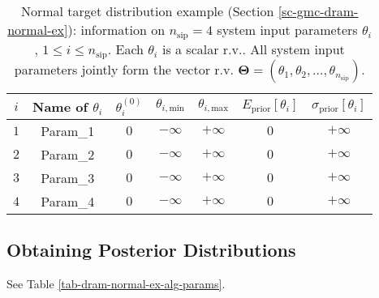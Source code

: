 \begin{table}[h!]
\begin{center}
\begin{tabular}{|c|c|c|c|c|c|c|}
\hline
 $i$      & Name of $\theta_i$ & $\theta_i^{(0)}$ & $\theta_{i,\text{min}}$ & $\theta_{i,\text{max}}$ & $E_{\text{prior}}[\theta_i]$ & $\sigma_{\text{prior}}[\theta_i]$ \\
\hline
\hline
 $1$      & Param\_1           & $0$              & $-\infty$               & $+\infty$               & $0$                          & $+\infty$                    \\
\hline
 $2$      & Param\_2           & $0$              & $-\infty$               & $+\infty$               & $0$                          & $+\infty$                    \\
\hline
 $3$      & Param\_3           & $0$              & $-\infty$               & $+\infty$               & $0$                          & $+\infty$                    \\
\hline
 $4$      & Param\_4           & $0$              & $-\infty$               & $+\infty$               & $0$                          & $+\infty$                    \\
\hline
\end{tabular}
\caption{Normal target distribution example (Section \ref{sc-gmc-dram-normal-ex}):
information on $n_{\text{sip}}=4$ system input parameters $\theta_i$, $1\leqslant i\leqslant n_{\text{sip}}$.
Each $\theta_i$ is a scalar r.v.. All system input parameters jointly form the vector r.v. $\boldsymbol{\Theta}=(\theta_1,\theta_2,\ldots,\theta_{n_{\text{sip}}})$.
}
\label{tab-dram-normal-ex-sys-input-params}
\end{center}
\end{table}

\subsection{Obtaining Posterior Distributions}

See Table \ref{tab-dram-normal-ex-alg-params}.

